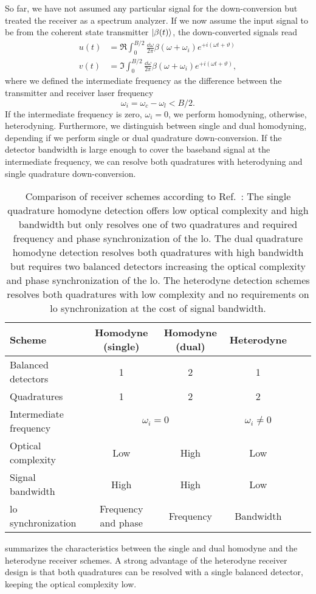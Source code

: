 So far, we have not assumed any particular signal for the down-conversion but treated the receiver as a spectrum analyzer.
If we now assume the input signal to be from the coherent state transmitter $\lvert\beta(t)\rangle$, the down-converted signals read
\begin{align}
	u(t)
	&=
	\Re
	\int_0^{B/2}\frac{\dd{\omega}}{2\pi}
	\beta(\omega+\omega_i)
	e^{+i(\omega t+\vartheta)}
	\label{eq:receiver_demod_real}
	\\
	v(t)
	&=
	\Im
	\int_0^{B/2}\frac{\dd{\omega}}{2\pi}
	\beta(\omega+\omega_i)
	e^{+i(\omega t+\vartheta)}
	\label{eq:receiver_demod_imag}
	,
\end{align}
where we defined the intermediate frequency as the difference between the transmitter and receiver laser frequency
\begin{equation}
	\omega_i
	=
	\omega_c-\omega_l
	<
	B/2
	.
\end{equation}
If the intermediate frequency is zero, $\omega_i=0$, we perform homodyning, otherwise, heterodyning.
Furthermore, we distinguish between single and dual homodyning, depending if we perform single or dual quadrature down-conversion.
If the detector bandwidth is large enough to cover the baseband signal at the intermediate frequency, we can resolve both quadratures with heterodyning and single quadrature down-conversion.
\begin{table}[htb]
  \centering
  \begin{tabular}{lccccc}
    \toprule
    Scheme & Homodyne (single) & Homodyne (dual) & Heterodyne \\
    \midrule
    Balanced detectors & \num{1} & \num{2} & \num{1} \\
    Quadratures & \num{1} & \num{2} & \num{2} \\
    Intermediate frequency & \multicolumn{2}{c}{$\omega_i=0$} & $\omega_i\neq 0$ \\
    Optical complexity & Low & High & Low \\
    Signal bandwidth & High & High & Low \\
    \gls{lo} synchronization & Frequency and phase & Frequency & Bandwidth \\
    \bottomrule
  \end{tabular}
  \caption{Comparison of receiver schemes according to Ref.~\cite{Brunner2017}: The single quadrature homodyne detection offers low optical complexity and high bandwidth but only resolves one of two quadratures and required frequency and phase synchronization of the \gls{lo}. The dual quadrature homodyne detection resolves both quadratures with high bandwidth but requires two balanced detectors increasing the optical complexity and phase synchronization of the \gls{lo}. The heterodyne detection schemes resolves both quadratures with low complexity and no requirements on \gls{lo} synchronization at the cost of signal bandwidth.}\label{tab:receivers}
\end{table}
 summarizes the characteristics between the single and dual homodyne and the heterodyne receiver schemes.
A strong advantage of the heterodyne receiver design is that both quadratures can be resolved with a single balanced detector, keeping the optical complexity low.

